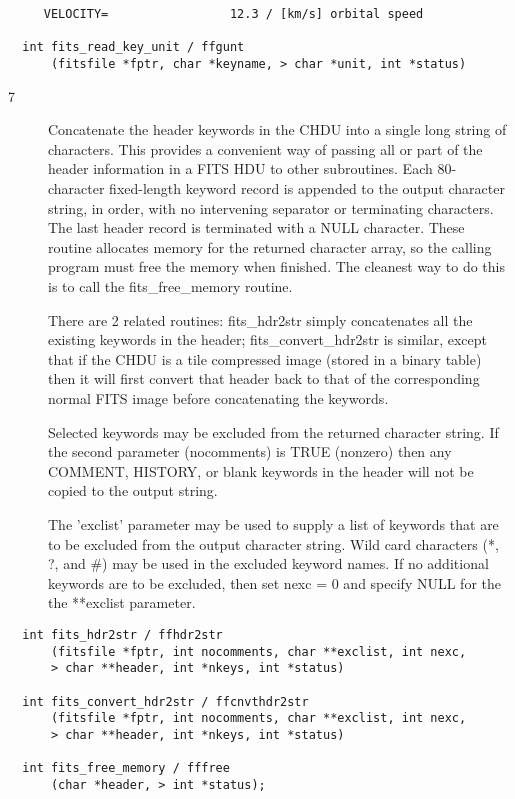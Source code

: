 \documentclass[11pt]{book}
\begin{document}
\begin{verbatim}
     VELOCITY=                 12.3 / [km/s] orbital speed

  int fits_read_key_unit / ffgunt
      (fitsfile *fptr, char *keyname, > char *unit, int *status)
\end{verbatim}

\begin{description}
\item[7 ] Concatenate the header keywords in the CHDU into a single long
    string of characters.  This provides a convenient way of passing
    all or part of the header information in a FITS HDU to other subroutines.
    Each 80-character fixed-length keyword record is appended to the
    output character string, in order, with no intervening separator or
    terminating characters. The last header record is terminated with
    a NULL character.  These routine allocates memory for the returned
    character array, so the calling program must free the memory when
    finished.  The cleanest way to do this is to
    call the fits\_free\_memory routine.

    There are 2 related routines: fits\_hdr2str simply concatenates all
    the existing keywords in the header; fits\_convert\_hdr2str is similar,
    except that if the CHDU is a tile compressed image (stored in a binary
    table) then it will first convert that header back to that of the corresponding
    normal FITS image before concatenating the keywords.

    Selected keywords may be excluded from the returned character string.
    If the second parameter (nocomments) is TRUE (nonzero) then any
    COMMENT, HISTORY, or blank keywords in the header will not be copied
    to the output string.

    The 'exclist' parameter may be used to supply a list of keywords
    that are to be excluded from the output character string. Wild card
    characters (*, ?, and \#) may be used in the excluded keyword names.
    If no additional keywords are to be excluded, then set nexc = 0 and
   specify NULL for the the **exclist  parameter.  \label{ffhdr2str}
\end{description}

\begin{verbatim}
  int fits_hdr2str / ffhdr2str
      (fitsfile *fptr, int nocomments, char **exclist, int nexc,
      > char **header, int *nkeys, int *status)

  int fits_convert_hdr2str / ffcnvthdr2str
      (fitsfile *fptr, int nocomments, char **exclist, int nexc,
      > char **header, int *nkeys, int *status)

  int fits_free_memory / fffree
      (char *header, > int *status);

\end{verbatim}
\end{document}

